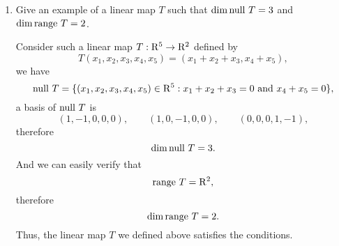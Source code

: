 \begin{enumerate}
    \item Give an example of a linear map $T$ such that $\dim{\text{null}~T} = 3$ and $\dim{\text{range}~T} = 2$.
        \begin{solution}
            Consider such a linear map $T: \mathrm{R}^5 \to \mathrm{R}^2$ defined by 
            \[ T(x_1, x_2, x_3, x_4, x_5) = (x_1+x_2+x_3, x_4+x_5), \]
            we have 
            \[ \text{null}~T = \{(x_1,x_2,x_3,x_4,x_5)\in \mathrm{R}^5: x_1+x_2+x_3=0 \text{ and } x_4 + x_5=0 \},\]
            a basis of $\text{null}~T$ is 
            \[ (1,-1,0,0,0), \qquad (1,0,-1,0,0), \qquad (0,0,0,1,-1),\]
            therefore 
            \[ \dim{\text{null}~T} = 3.\]
            And we can easily verify that 
            \[ \text{range}~T = \mathrm{R}^2 ,\]
            therefore 
            \[ \dim{\text{range}~T} = 2.\]
            Thus, the linear map $T$ we defined above satisfies the conditions.


\end{solution}
\end{enumerate}
